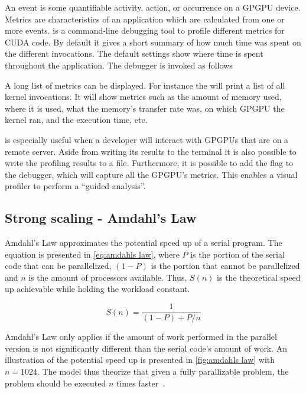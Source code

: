 An event is some quantifiable activity, action, or occurrence on a GPGPU device.
Metrics are characteristics of an application which are calculated from one or more events.
 is a command-line debugging tool to profile different metrics for CUDA code.
By default it gives a short summary of how much time was spent on the different invocations.
The default settings show where time is spent throughout the application.
The debugger is invoked as follows
%
\begin{quote}
\end{quote}
%
A long list of metrics can be displayed.
For instance the  will print a list of all kernel invocations.
It will show metrics such as the amount of memory used, where it is used, what the memory's transfer rate was, on which GPGPU the kernel ran, and the execution time, etc.~\cite{profiling2015doc}

 is especially useful when a developer will interact with GPGPUs that are on a remote server.
Aside from writing its results to the terminal it is also possible to write the profiling results to a file.
Furthermore, it is possible to add the  flag to the debugger, which will capture all the GPGPU's metrics.
This enables a visual profiler to perform a ``guided analysis''.~\cite{nvprof2013tips}

\subsection{Strong scaling - Amdahl's Law}
\label{sec:amdahls law}

Amdahl's Law approximates the potential speed up of a serial program.
The equation is presented in \cref{eq:amdahls law}, where $P$ is the portion of the serial code that can be parallelized, $(1-P)$ is the portion that cannot be parallelized and $n$ is the amount of processors available.
Thus, $S(n)$ is the theoretical speed up achievable while holding the workload constant.

\begin{equation}
  \label{eq:amdahls law}
  S(n) = \frac{1}{(1-P) + P/n}
\end{equation}

Amdahl's Law only applies if the amount of work performed in the parallel version is not significantly different than the serial code's amount of work.
An illustration of the potential speed up is presented in \cref{fig:amdahls law} with $n=1024$.
The model thus theorize that given a fully parallizable problem, the problem should be executed $n$ times faster~\cite{farber2011cuda}.

